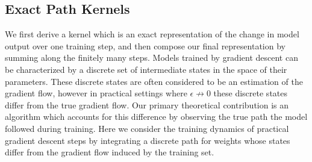 \subsection{Exact Path Kernels}

 We first derive a kernel which is an exact representation of the change in model output over one training step, and then compose our final representation by summing along the finitely many steps.
Models trained by gradient descent can be characterized by a discrete set of intermediate states in the space of their parameters.
These discrete states are often considered to be an estimation of the gradient flow, however in practical settings where $\epsilon \not \rightarrow 0$ these discrete states differ from the true gradient flow.
Our primary theoretical contribution is an algorithm which accounts for this difference by observing the true path the model followed during training.
Here we consider the training dynamics of practical gradient descent steps by integrating a discrete path for weights whose states differ from the gradient flow induced by the training set.

